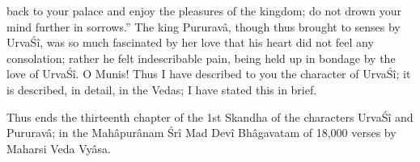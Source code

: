 back to your palace and enjoy the pleasures of the kingdom; do not drown your mind further in sorrows.'' The king Pururav\^a, though thus brought to senses by Urva\'S\^i, was so much fascinated by her love that his heart did not feel any consolation; rather he felt indescribable pain, being held up in bondage by the love of Urva\'S\^i. O Munis! Thus I have described to you the character of Urva\'S\^i; it is described, in detail, in the Vedas; I have stated this in brief.

Thus ends the thirteenth chapter of the 1st Skandha of the characters Urva\'S\^i and Pururav\^a; in the Mah\^apur\^anam \'Sr\^i Mad Dev\^i Bh\^agavatam of 18,000 verses by Maharsi Veda Vy\^asa.